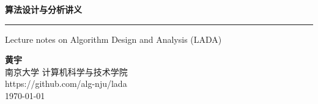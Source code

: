 \begin{titlepage}
    
\raggedright  %
\vspace*{4cm}

{
    \fontsize{36pt}{40pt}\selectfont\bfseries
    算法设计与分析讲义
}
\vspace{1cm}

{
    \rule{\textwidth}{1.5pt}
}
\vspace{0.6cm}

{
    \Large \hspace{0.1em} Lecture notes on Algorithm Design and Analysis (LADA)
}
\vfill

\begin{minipage}{0.6\textwidth}
{
    \large
    \textbf{\Large 黄宇}\\[0.3em]
    南京大学 计算机科学与技术学院 \\[0.3em]
    https://github.com/alg-nju/lada \\[0.3em]
    \today
    \vspace{1cm}
}
    
\end{minipage}

\end{titlepage}
